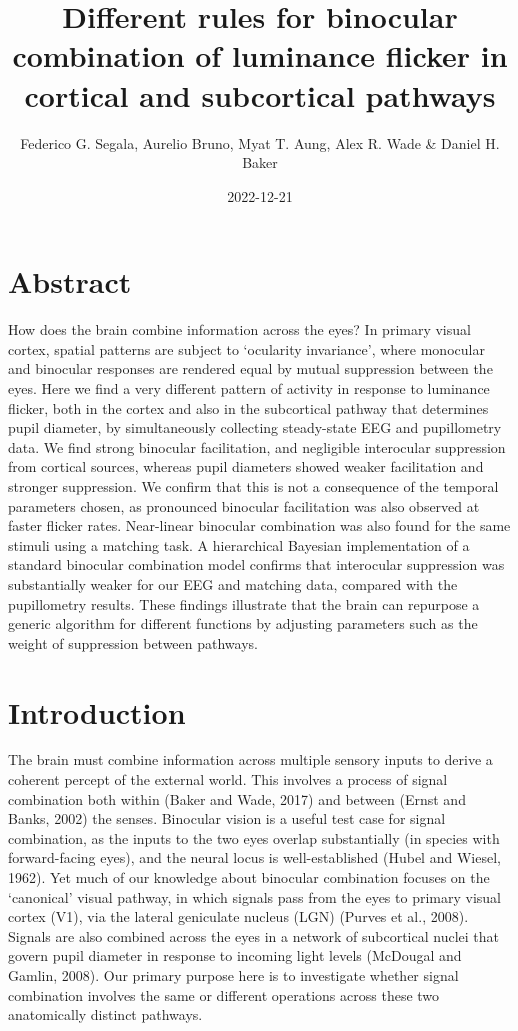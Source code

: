 \documentclass[
]{article}
\title{Different rules for binocular combination of luminance flicker in cortical and subcortical pathways}
\author{Federico G. Segala, Aurelio Bruno, Myat T. Aung, Alex R. Wade \& Daniel H. Baker}
\date{2022-12-21}
\begin{document}
\maketitle

\hypertarget{abstract}{%
\section{Abstract}\label{abstract}}

How does the brain combine information across the eyes? In primary visual cortex, spatial patterns are subject to `ocularity invariance', where monocular and binocular responses are rendered equal by mutual suppression between the eyes. Here we find a very different pattern of activity in response to luminance flicker, both in the cortex and also in the subcortical pathway that determines pupil diameter, by simultaneously collecting steady-state EEG and pupillometry data. We find strong binocular facilitation, and negligible interocular suppression from cortical sources, whereas pupil diameters showed weaker facilitation and stronger suppression. We confirm that this is not a consequence of the temporal parameters chosen, as pronounced binocular facilitation was also observed at faster flicker rates. Near-linear binocular combination was also found for the same stimuli using a matching task. A hierarchical Bayesian implementation of a standard binocular combination model confirms that interocular suppression was substantially weaker for our EEG and matching data, compared with the pupillometry results. These findings illustrate that the brain can repurpose a generic algorithm for different functions by adjusting parameters such as the weight of suppression between pathways.

\hypertarget{introduction}{%
\section{Introduction}\label{introduction}}

The brain must combine information across multiple sensory inputs to derive a coherent percept of the external world. This involves a process of signal combination both within (Baker and Wade, 2017) and between (Ernst and Banks, 2002) the senses. Binocular vision is a useful test case for signal combination, as the inputs to the two eyes overlap substantially (in species with forward-facing eyes), and the neural locus is well-established (Hubel and Wiesel, 1962). Yet much of our knowledge about binocular combination focuses on the `canonical' visual pathway, in which signals pass from the eyes to primary visual cortex (V1), via the lateral geniculate nucleus (LGN) (Purves et al., 2008). Signals are also combined across the eyes in a network of subcortical nuclei that govern pupil diameter in response to incoming light levels (McDougal and Gamlin, 2008). Our primary purpose here is to investigate whether signal combination involves the same or different operations across these two anatomically distinct pathways.
\end{document}
